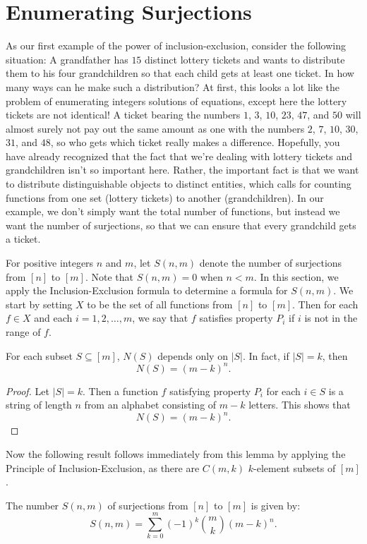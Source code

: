 \section{Enumerating Surjections}\label{s:inclusion-exclusion:surjections}

As our first example of the power of inclusion-exclusion, consider the
following situation: A grandfather has $15$ distinct lottery tickets
and wants to distribute them to his four grandchildren so that each
child gets at least one ticket. In how many ways can he make such a
distribution? At first, this looks a lot like the problem of
enumerating integers solutions of equations, except here the lottery
tickets are not identical! A ticket bearing the numbers $1$, $3$,
$10$, $23$, $47$, and $50$ will almost surely not pay out the same
amount as one with the numbers $2$, $7$, $10$, $30$, $31$, and $48$,
so who gets which ticket really makes a difference. Hopefully, you
have already recognized that the fact that we're dealing with lottery
tickets and grandchildren isn't so important here. Rather, the
important fact is that we want to distribute distinguishable objects
to distinct entities, which calls for counting functions from one set
(lottery tickets) to another (grandchildren). In our example, we don't
simply want the total number of functions, but instead we want the
number of surjections, so that we can ensure that every grandchild
gets a ticket.

For positive integers $n$ and $m$, let $S(n,m)$ denote the number of
surjections from $[n]$ to $[m]$.  Note that $S(n,m)=0$ when $n<m$.  In
this section, we apply the Inclusion-Exclusion formula to determine a
formula for $S(n,m)$.  We start by setting $X$ to be the set of all
functions from $[n]$ to $[m]$.  Then for each $f\in X$ and each
$i=1,2,\dots,m$, we say that $f$ satisfies property $P_i$ if $i$ is
not in the range of $f$.

\begin{lemma}
  For each subset $S\subseteq [m]$, $N(S)$ depends only on $|S|$.  In
  fact, if $|S|=k$, then
  \[
  N(S)=(m-k)^n.
  \]
\end{lemma}
\begin{proof}
Let $|S|=k$.  Then a
function $f$ satisfying property $P_i$ for each $i\in S$ is
a string of length $n$ from an alphabet consisting of $m-k$ letters.
This shows that \[N(S)=(m-k)^n.\]
\end{proof}

Now the following result follows immediately from this lemma by
applying the Principle of Inclusion-Exclusion, as there are $C(m,k)$
$k$-element subsets of $[m]$.
\begin{theorem}
  The number $S(n,m)$ of surjections from $[n]$ to $[m]$ is given by:
\[
S(n,m) = \sum_{k=0}^m (-1)^k\binom{m}{k}(m-k)^n.
\]
\end{theorem}

